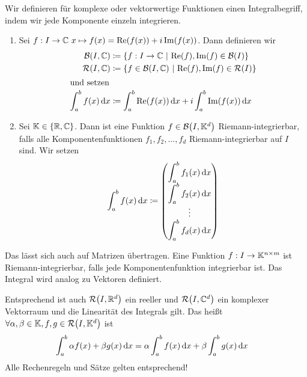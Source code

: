 \begin{definition}
    Wir definieren für komplexe oder vektorwertige Funktionen einen Integralbegriff, indem wir jede Komponente einzeln integrieren.
    \begin{enumerate}[label=(\roman*)]
        \item Sei $f: I\fromto\C~x\mapsto f\of{x} = \Re\of{f\of{x}} + i\Im\of{f\of{x}}$. Dann definieren wir
        \begin{align*}
            \mB\of{I, \C} &\coloneqq\set{f: I\fromto\C~\middle\vert~\Re\of{f}, \Im\of{f} \in \mB\of{I}}\\
            \mR\of{I, \C} &\coloneqq\set{f\in\mB\of{I, \C}~\middle\vert~\Re\of{f}, \Im\of{f}\in \mR\of{I}}\\
            \intertext{und setzen}
            \int_{a}^{b} f\of{x} \dif x &\coloneqq \int_{a}^{b} \Re\of{f\of{x}} \dif x + i\int_{a}^{b} \Im\of{f\of{x}} \dif x
        \end{align*}
        \item Sei $\mathbb{K}\in\left\{\mathbb{R}, \mathbb{C}\right\}$. Dann ist eine Funktion $f\in\mB\of{I, \K^d}$ Riemann-integrierbar, falls alle Komponentenfunktionen $f_1, f_2, \dots, f_d$ Riemann-integrierbar auf $I$ sind. Wir setzen
        \begin{align*}
            \int_{a}^{b} f\of{x} \dif x\coloneqq \begin{pmatrix}
                                                     \displaystyle\int_{a}^{b} f_1\of{x} \dif x \\
                                                     \displaystyle\int_{a}^{b} f_2\of{x} \dif x \\
                                                     \vdots                                     \\
                                                     \displaystyle\int_{a}^{b} f_d\of{x} \dif x
            \end{pmatrix}
        \end{align*}
    \end{enumerate}
\end{definition}

\begin{bemerkung}
    Das lässt sich auch auf Matrizen übertragen. Eine Funktion $f: I\rightarrow{} \mathbb{K}^{n\times m}$ ist Riemann-integrierbar, falls jede Komponentenfunktion integrierbar ist. Das Integral wird analog zu Vektoren definiert.
\end{bemerkung}

\begin{bemerkung}
    Entsprechend ist auch $\mR\of{I, \R^d}$ ein reeller und $\mR\of{I, \C^d}$ ein komplexer Vektorraum und die Linearität des Integrals gilt. Das heißt $\forall \alpha,\beta\in\K, f,g\in\mR\of{I, \K^d}$ ist
    \begin{align*}
        \int_{a}^{b} \alpha f\of{x} + \beta g\of{x} \dif x &= \alpha \int_{a}^{b} f\of{x} \dif x + \beta \int_{a}^{b} g\of{x} \dif x
    \end{align*}
    Alle Rechenregeln und Sätze gelten entsprechend!
\end{bemerkung}

\newpage
